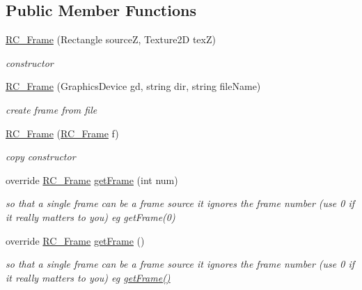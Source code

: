 \subsection*{Public Member Functions}
\begin{DoxyCompactItemize}
\item 
\mbox{\hyperlink{class_r_c___framework_1_1_r_c___frame_ac98c117754dc66b735a58067ea2f7f8d}{R\+C\+\_\+\+Frame}} (Rectangle sourceZ, Texture2D texZ)
\begin{DoxyCompactList}\small\item\em constructor \end{DoxyCompactList}\item 
\mbox{\hyperlink{class_r_c___framework_1_1_r_c___frame_a0ffc0dddb25f22ad5ef471848f02005b}{R\+C\+\_\+\+Frame}} (Graphics\+Device gd, string dir, string file\+Name)
\begin{DoxyCompactList}\small\item\em create frame from file \end{DoxyCompactList}\item 
\mbox{\hyperlink{class_r_c___framework_1_1_r_c___frame_a5f7ccf1fe93891b8fff92d76c716ce9e}{R\+C\+\_\+\+Frame}} (\mbox{\hyperlink{class_r_c___framework_1_1_r_c___frame}{R\+C\+\_\+\+Frame}} f)
\begin{DoxyCompactList}\small\item\em copy constructor \end{DoxyCompactList}\item 
override \mbox{\hyperlink{class_r_c___framework_1_1_r_c___frame}{R\+C\+\_\+\+Frame}} \mbox{\hyperlink{class_r_c___framework_1_1_r_c___frame_ad0a2ae1e80157a79713552d9484eb5de}{get\+Frame}} (int num)
\begin{DoxyCompactList}\small\item\em so that a single frame can be a frame source it ignores the frame number (use 0 if it really matters to you) eg get\+Frame(0) \end{DoxyCompactList}\item 
override \mbox{\hyperlink{class_r_c___framework_1_1_r_c___frame}{R\+C\+\_\+\+Frame}} \mbox{\hyperlink{class_r_c___framework_1_1_r_c___frame_a9262ade99ade9dc102aac56587d55d0f}{get\+Frame}} ()
\begin{DoxyCompactList}\small\item\em so that a single frame can be a frame source it ignores the frame number (use 0 if it really matters to you) eg \mbox{\hyperlink{class_r_c___framework_1_1_r_c___frame_a9262ade99ade9dc102aac56587d55d0f}{get\+Frame()}} \end{DoxyCompactList}\item 

\end{DoxyCompactItemize}

